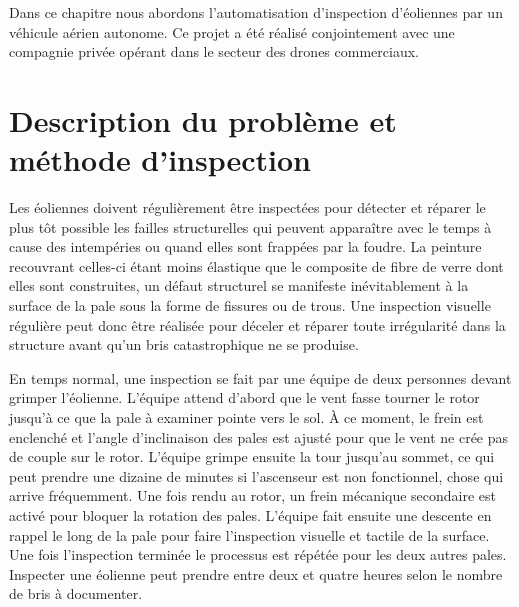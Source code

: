 \label{sec:uav}

Dans ce chapitre nous abordons l'automatisation d'inspection d'éoliennes par un véhicule aérien autonome. Ce projet a été réalisé conjointement avec une compagnie privée opérant dans le secteur des drones commerciaux.

\section{Description du problème et méthode d'inspection}

Les éoliennes doivent régulièrement être inspectées pour détecter et réparer le plus tôt possible les failles structurelles qui peuvent apparaître avec le temps à cause des intempéries ou quand elles sont frappées par la foudre. La peinture recouvrant celles-ci étant moins élastique que le composite de fibre de verre dont elles sont construites, un défaut structurel se manifeste inévitablement à la surface de la pale sous la forme de fissures ou de trous. Une inspection visuelle régulière peut donc être réalisée pour déceler et réparer toute irrégularité dans la structure avant qu'un bris catastrophique ne se produise.

En temps normal, une inspection se fait par une équipe de deux personnes devant grimper l'éolienne. L'équipe attend d'abord que le vent fasse tourner le rotor jusqu'à ce que la pale à examiner pointe vers le sol. À ce moment, le frein est enclenché et l'angle d'inclinaison des pales est ajusté pour que le vent ne crée pas de couple sur le rotor. L'équipe grimpe ensuite la tour jusqu'au sommet, ce qui peut prendre une dizaine de minutes si l'ascenseur est non fonctionnel, chose qui arrive fréquemment. Une fois rendu au rotor, un frein mécanique secondaire est activé pour bloquer la rotation des pales. L'équipe fait ensuite une descente en rappel le long de la pale pour faire l'inspection visuelle et tactile de la surface. Une fois l'inspection terminée le processus est répétée pour les deux autres pales. Inspecter une éolienne peut prendre entre deux et quatre heures selon le nombre de bris à documenter.


